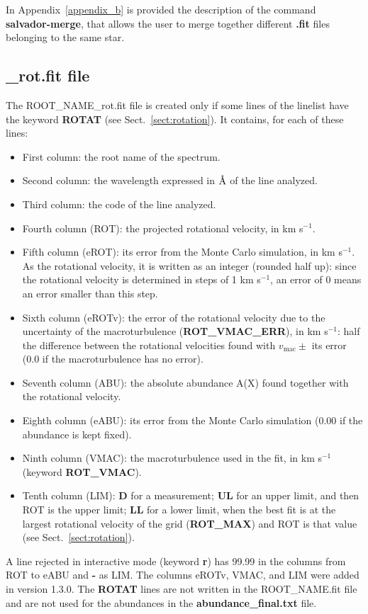 \documentclass[modern]{aastex701}
\newcommand{\angstrom}{\mbox{\normalfont\AA}}
\begin{document}
In Appendix~\ref{appendix_b} is provided the description of the command {\bf salvador-merge}, that allows the user to merge together different {\bf .fit} files belonging to the same star. 


\subsection{\_rot.fit file} \label{sect:rot_fit}
The ROOT\_NAME\_rot.fit file is created only if some lines of the linelist have the keyword {\bf ROTAT} (see Sect.~\ref{sect:rotation}). It contains, for each of these lines:
\begin{itemize}
    \item First column: the root name of the spectrum.
    \item Second column: the wavelength expressed in $\angstrom$ of the line analyzed.
    \item Third column: the code of the line analyzed.
    \item Fourth column (ROT): the projected rotational velocity, in km s$^{-1}$.
    \item Fifth column (eROT): its error from the Monte Carlo simulation, in km s$^{-1}$. As the rotational velocity, it is written as an integer (rounded half up): since the rotational velocity is determined in steps of 1 km s$^{-1}$, an error of 0 means an error smaller than this step.
    \item Sixth column (eROTv): the error of the rotational velocity due to the uncertainty of the macroturbulence ({\bf ROT\_VMAC\_ERR}), in km s$^{-1}$: half the difference between the rotational velocities found with $v_{\mathrm{mac}} \pm$ its error (0.0 if the macroturbulence has no error).
    \item Seventh column (ABU): the absolute abundance A(X) found together with the rotational velocity.
    \item Eighth column (eABU): its error from the Monte Carlo simulation (0.00 if the abundance is kept fixed).
    \item Ninth column (VMAC): the macroturbulence used in the fit, in km s$^{-1}$ (keyword {\bf ROT\_VMAC}).
    \item Tenth column (LIM): {\bf D} for a measurement; {\bf UL} for an upper limit, and then ROT is the upper limit; {\bf LL} for a lower limit, when the best fit is at the largest rotational velocity of the grid ({\bf ROT\_MAX}) and ROT is that value (see Sect.~\ref{sect:rotation}).
\end{itemize}
A line rejected in interactive mode (keyword {\bf r}) has 99.99 in the columns from ROT to eABU and {\bf -} as LIM. The columns eROTv, VMAC, and LIM were added in version 1.3.0. The {\bf ROTAT} lines are not written in the ROOT\_NAME.fit file and are not used for the abundances in the {\bf abundance\_final.txt} file. 
\end{document}
